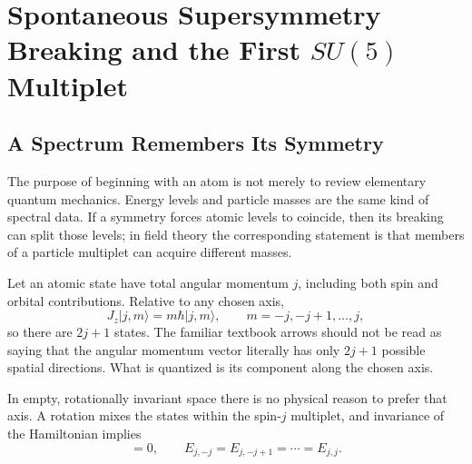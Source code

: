 \chapter{Spontaneous Supersymmetry Breaking and the First \texorpdfstring{\(SU(5)\)}{SU(5)} Multiplet}


\section{A Spectrum Remembers Its Symmetry}

The purpose of beginning with an atom is not merely to review elementary quantum mechanics. Energy levels and particle masses are the same kind of spectral data. If a symmetry forces atomic levels to coincide, then its breaking can split those levels; in field theory the corresponding statement is that members of a particle multiplet can acquire different masses.

Let an atomic state have total angular momentum \(j\), including both spin and orbital contributions. Relative to any chosen axis,
\begin{equation}
J_z|j,m\rangle=m\hbar|j,m\rangle,
\qquad
m=-j,-j+1,\ldots,j,
\end{equation}
so there are \(2j+1\) states. The familiar textbook arrows should not be read as saying that the angular momentum vector literally has only \(2j+1\) possible spatial directions. What is quantized is its component along the chosen axis.

In empty, rotationally invariant space there is no physical reason to prefer that axis. A rotation mixes the states within the spin-\(j\) multiplet, and invariance of the Hamiltonian implies
\begin{equation}
[H,\mathbf J]=0,
\qquad
E_{j,-j}=E_{j,-j+1}=\cdots=E_{j,j}.
\label{eq:l9-degeneracy}
\end{equation}

